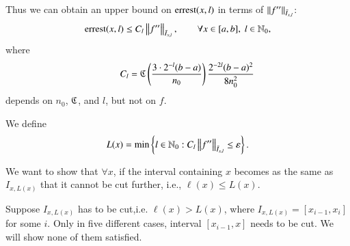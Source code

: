 Thus
we can obtain an upper bound on $\errest(x,l)$ in terms of $ \norm[\bar{I}_{x,l}]{f''}$:
\[
 \errest(x,l)  \le C_l \norm[\bar{I}_{x,l}]{f''}, \qquad \forall x \in [a,b], \ l \in \natzero,
\]
where
\[\qquad C_l=\fC\left(\frac{3\cdot2^{-l}(b-a)}{n_0}\right) \frac{2^{-2l}(b-a)^2}{8n^2_0}
\]
depends on $n_0$, $\fC$, and $l$, but not on $f$.

We define
\begin{equation}\label{eqn:defoflx}
L(x) = \min \left\{ l \in \natzero : C_l  \norm[\bar{I}_{x,l}]{f''} \le \varepsilon\right\} .
\end{equation}

We want to show that $\forall x$, if the interval containing $x$ becomes as the same as
$I_{x,L(x)}$ that it cannot be cut further, i.e., $\ell(x) \le L(x)$. 

Suppose $I_{x,L(x)}$ has to be cut,i.e. $\ell(x)>L(x)$, where $I_{x,L(x)}=[x_{i-1},x_i]$ for some $i$. Only in five different cases, interval $[x_{i-1},x]$ needs to be cut.
We will show none of them satisfied.
